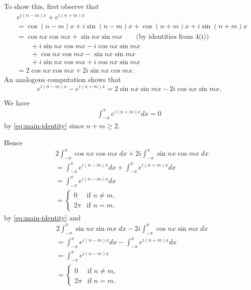\documentclass[oneside]{article}
\begin{document}
  To show this, first observe that \begin{align*}
    &e^{i(n-m)x} + e^{i(n+m)x} \\
    &= \cos(n-m)x + i\sin(n-m)x + \cos(n+m)x + i\sin(n+m)x \\
    &= \cos nx \cos mx + \sin nx \sin mx \qquad\text{(by identities from 4(i))} \\
    &\qquad+i\sin nx \cos mx - i\cos nx \sin mx \\
    &\qquad+\cos nx \cos mx - \sin nx \sin mx \\
    &\qquad+i\sin nx \cos mx + i\cos nx \sin mx  \\
    &= 2\cos nx \cos mx + 2i\sin nx \cos mx \text{.}
  \end{align*} An analogous computation shows that \[
    e^{i(n-m)x} - e^{i(n+m)x} = 2\sin nx \sin mx - 2i\cos nx \sin mx \text{.}
  \]

  We have \begin{align*}
    \int_{-\pi}^{\pi}{e^{i(n+m)x}}dx = 0
  \end{align*} by \eqref{eq:main-identity} since $n + m \geq 2$.

  Hence \begin{align*}
    & 2\int_{-\pi}^\pi\cos nx \cos mx\;dx + 2i\int_{-\pi}^\pi\sin nx \cos mx\;dx \\
    &= \int_{-\pi}^\pi e^{i(n-m)x} dx + \int_{-\pi}^\pi e^{i(n+m)x} dx \\
    &= \int_{-\pi}^\pi e^{i(n-m)x} dx \\
    &= \begin{cases}
      0 & \text{if }n \neq m \text{,} \\
      2\pi & \text{if }n = m \text{,}
    \end{cases}
  \end{align*} by \eqref{eq:main-identity} and \begin{align*}
    & 2\int_{-\pi}^\pi\sin nx \sin mx\;dx - 2i\int_{-\pi}^\pi\cos nx \sin mx\;dx \\
    &= \int_{-\pi}^\pi e^{i(n-m)x} dx - \int_{-\pi}^\pi e^{i(n+m)x} dx \\
    &= \int_{-\pi}^\pi e^{i(n-m)x} \\
    &= \begin{cases}
      0 & \text{if }n \neq m \text{,} \\
      2\pi & \text{if }n = m \text{.}
    \end{cases}
  \end{align*}
\end{document}
